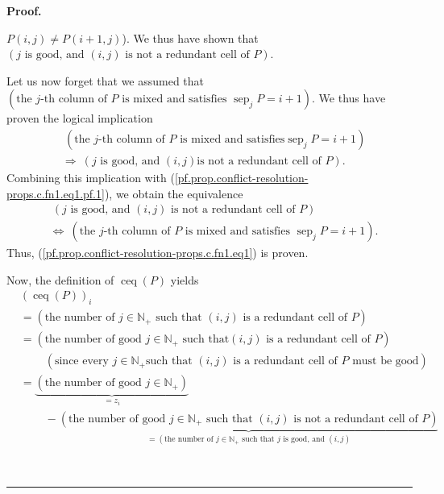 \documentclass[numbers=enddot,12pt,final,onecolumn,notitlepage]{scrartcl}%
\theoremstyle{definition}
\newenvironment{proof}[1][Proof]{\noindent\textbf{#1.} }{\ \rule{0.5em}{0.5em}}
\newenvironment{verlong}{}{}
\begin{document}
\begin{verlong}
\begin{proof}
{$P\left(  i,j\right)  \neq P\left(  i+1,j\right)  $). We thus have shown that
$\left(  j\text{ is good, and }\left(  i,j\right)  \text{ is not a redundant
cell of }P\right)  $.
\par
Let us now forget that we assumed that $\left(  \text{the }j\text{-th column
of }P\text{ is mixed and satisfies }\operatorname*{sep}\nolimits_{j}%
P=i+1\right)  $. We thus have proven the logical implication%
\begin{align*}
&  \ \left(  \text{the }j\text{-th column of }P\text{ is mixed and satisfies
}\operatorname*{sep}\nolimits_{j}P=i+1\right) \\
&  \Longrightarrow\ \left(  j\text{ is good, and }\left(  i,j\right)  \text{
is not a redundant cell of }P\right)  .
\end{align*}
Combining this implication with
(\ref{pf.prop.conflict-resolution-props.c.fn1.eq1.pf.1}), we obtain the
equivalence%
\begin{align*}
&  \ \left(  j\text{ is good, and }\left(  i,j\right)  \text{ is not a
redundant cell of }P\right) \\
&  \Longleftrightarrow\ \left(  \text{the }j\text{-th column of }P\text{ is
mixed and satisfies }\operatorname*{sep}\nolimits_{j}P=i+1\right)  .
\end{align*}
Thus, (\ref{pf.prop.conflict-resolution-props.c.fn1.eq1}) is proven.
\par
Now, the definition of $\operatorname*{ceq}\left(  P\right)  $ yields%
\begin{align*}
&  \left(  \operatorname*{ceq}\left(  P\right)  \right)  _{i}\\
&  =\left(  \text{the number of }j\in\mathbb{N}_{+}\text{ such that }\left(
i,j\right)  \text{ is a redundant cell of }P\right) \\
&  =\left(  \text{the number of good }j\in\mathbb{N}_{+}\text{ such that
}\left(  i,j\right)  \text{ is a redundant cell of }P\right) \\
&  \ \ \ \ \ \ \ \ \ \ \left(  \text{since every }j\in\mathbb{N}_{+}\text{
such that }\left(  i,j\right)  \text{ is a redundant cell of }P\text{ must be
good}\right) \\
&  =\underbrace{\left(  \text{the number of good }j\in\mathbb{N}_{+}\right)
}_{=z_{i}}\\
&  \ \ \ \ \ \ \ \ \ \ -\underbrace{\left(  \text{the number of good }%
j\in\mathbb{N}_{+}\text{ such that }\left(  i,j\right)  \text{ is not a
redundant cell of }P\right)  }_{=\left(  \text{the number of }j\in
\mathbb{N}_{+}\text{ such that }j\text{ is good, and }\left(  i,j\right)
}
\end{align*}}
\end{proof}
\end{verlong}
\end{document}
